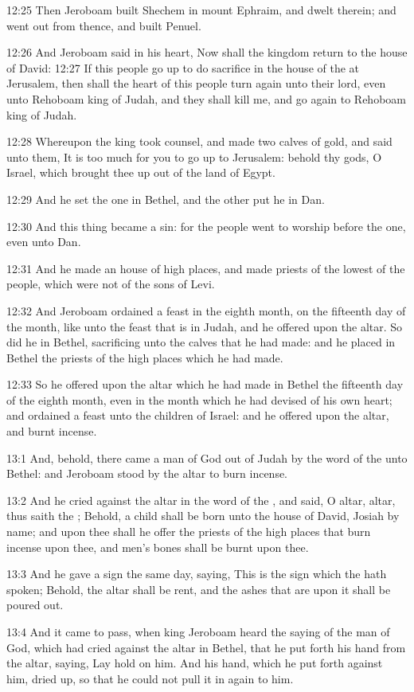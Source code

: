 12:25 Then Jeroboam built Shechem in mount Ephraim, and dwelt therein;
and went out from thence, and built Penuel.

12:26 And Jeroboam said in his heart, Now shall the kingdom return to
the house of David: 12:27 If this people go up to do sacrifice in the
house of the \LORD at Jerusalem, then shall the heart of this people
turn again unto their lord, even unto Rehoboam king of Judah, and they
shall kill me, and go again to Rehoboam king of Judah.

12:28 Whereupon the king took counsel, and made two calves of gold,
and said unto them, It is too much for you to go up to Jerusalem:
behold thy gods, O Israel, which brought thee up out of the land of
Egypt.

12:29 And he set the one in Bethel, and the other put he in Dan.

12:30 And this thing became a sin: for the people went to worship
before the one, even unto Dan.

12:31 And he made an house of high places, and made priests of the
lowest of the people, which were not of the sons of Levi.

12:32 And Jeroboam ordained a feast in the eighth month, on the
fifteenth day of the month, like unto the feast that is in Judah, and
he offered upon the altar. So did he in Bethel, sacrificing unto the
calves that he had made: and he placed in Bethel the priests of the
high places which he had made.

12:33 So he offered upon the altar which he had made in Bethel the
fifteenth day of the eighth month, even in the month which he had
devised of his own heart; and ordained a feast unto the children of
Israel: and he offered upon the altar, and burnt incense.

13:1 And, behold, there came a man of God out of Judah by the word of
the \LORD unto Bethel: and Jeroboam stood by the altar to burn incense.

13:2 And he cried against the altar in the word of the \LORD, and said,
O altar, altar, thus saith the \LORD; Behold, a child shall be born
unto the house of David, Josiah by name; and upon thee shall he offer
the priests of the high places that burn incense upon thee, and men's
bones shall be burnt upon thee.

13:3 And he gave a sign the same day, saying, This is the sign which
the \LORD hath spoken; Behold, the altar shall be rent, and the ashes
that are upon it shall be poured out.

13:4 And it came to pass, when king Jeroboam heard the saying of the
man of God, which had cried against the altar in Bethel, that he put
forth his hand from the altar, saying, Lay hold on him. And his hand,
which he put forth against him, dried up, so that he could not pull it
in again to him.

